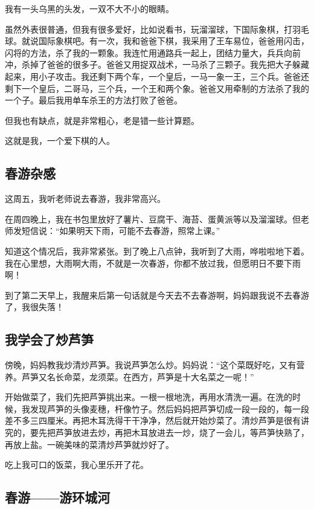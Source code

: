 \documentclass[UTF8,a4paper,titlepage,twoside,10.5pt]{article}
\begin{document}
我有一头乌黑的头发，一双不大不小的眼睛。

虽然外表很普通，但我有很多爱好，比如说看书，玩溜溜球，下国际象棋，打羽毛球。就说国际象棋吧。有一次，我和爸爸下棋，我采用了王车易位，爸爸用闪击，闪将的方法，杀了我的一颗象。我连忙用通路兵一起上，团结力量大，兵兵向前冲，杀掉了爸爸的很多子。爸爸又用捉双战术，一马杀了三颗子。我先把大子躲藏起来，用小子攻击。我还剩下两个车，一个皇后，一马一象一王，三个兵。爸爸还剩下一个皇后，二哥马，三个兵，一个王和两个象。爸爸又用牵制的方法杀了我的一个子。最后我用单车杀王的方法打败了爸爸。

但我也有缺点，就是非常粗心，老是错一些计算题。

这就是我，一个爱下棋的人。

\subsection{春游杂感}
\label{sec:orgf052a97}

这周五，我听老师说去春游，我非常高兴。

在周四晚上，我在书包里放好了薯片、豆腐干、海苔、蛋黄派等以及溜溜球。但老师发短信说：“如果明天下雨，可能不去春游，照常上课。”

知道这个情况后，我非常紧张。到了晚上八点钟，我听到了大雨，哗啦啦地下着。我在心里想，大雨啊大雨，不就是一次春游，你都不放过我，但愿明日不要下雨啊！

到了第二天早上，我醒来后第一句话就是今天去不去春游啊，妈妈跟我说不去春游了，我很失落！

\subsection{我学会了炒芦笋}
\label{sec:org6607c6e}

傍晚，妈妈教我炒清炒芦笋。我说芦笋怎么炒。妈妈说：“这个菜既好吃，又有营养。芦笋又名长命菜，龙须菜。在西方，芦笋是十大名菜之一呢！”

开始做菜了，我们先把芦笋挑出来。一根一根地洗，再用水清洗一遍。在洗的时候，我发现芦笋的头像麦穗，杆像竹子。然后妈妈把芦笋切成一段一段的，每一段差不多三四厘米。再把木耳洗得干干净净，然后就开始炒菜了。清炒芦笋是很有讲究的，要先把芦笋放进去炒，再把木耳放进去一炒，烧了一会儿，等芦笋快熟了，再放上盐。一碗美味的菜清炒芦笋就炒好了。

吃上我可口的饭菜，我心里乐开了花。

\subsection{春游——游环城河}
\label{sec:org744ddb8}
\end{document}
